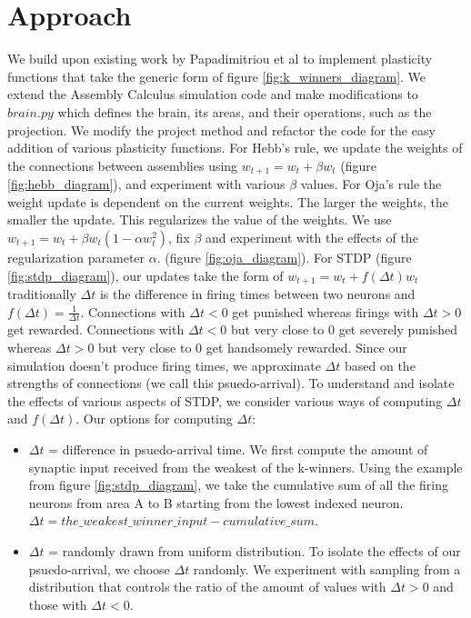 \documentclass{article}
\begin{document}
\section{Approach}
We build upon existing work by Papadimitriou et al \cite{Papadimitriou14464} to implement plasticity functions that take the generic form of figure \ref{fig:k_winners_diagram}.
We extend the Assembly Calculus simulation code \cite{assembly_calculus} and make modifications to $brain.py$ which defines the brain, its areas, and their operations, such as the projection.
We modify the project method and refactor the code for the easy addition of various plasticity functions.
For Hebb's rule, we update the weights of the connections between assemblies using $w_{t+1} = w_t + \beta w_t$ (figure \ref{fig:hebb_diagram}), and experiment with various $\beta$ values.
For Oja's rule the weight update is dependent on the current weights. The larger the weights, the smaller the update. This regularizes the value of the weights. We use $ w_{t+1} = w_t + \beta w_t (1 - \alpha w_t^2)$, fix $\beta$ and experiment with the effects of the regularization parameter $\alpha$.
(figure \ref{fig:oja_diagram}).
For STDP (figure \ref{fig:stdp_diagram}), our updates take the form of $w_{t+1} = w_t + f(\Delta t) w_t$ traditionally $\Delta t$ is the difference in firing times between two neurons and $f(\Delta t) = \frac{1}{\Delta t}$. Connections with $\Delta t < 0$ get punished whereas firings with $\Delta t > 0$ get rewarded. Connections with $\Delta t < 0$ but very close to 0 get severely punished whereas $\Delta t > 0$ but very close to 0 get handsomely rewarded. Since our simulation doesn't produce firing times, we approximate $\Delta t$ based on the strengths of connections (we call this psuedo-arrival). 
To understand and isolate the effects of various aspects of STDP, we consider various ways of computing $\Delta t$ and $f(\Delta t)$. Our options for computing  $\Delta t$:\\
\begin{itemize}
    \item $\Delta t$ = difference in psuedo-arrival time. We first compute the amount of synaptic input received from the weakest of the k-winners. Using the example from figure \ref{fig:stdp_diagram}, we take the cumulative sum of all the firing neurons from area A to B starting from the lowest indexed neuron. $\Delta t = the\_weakest\_winner\_input - cumulative\_sum$.
    \item $\Delta t$ = randomly drawn from uniform distribution. To isolate the effects of our psuedo-arrival, we choose $\Delta t$ randomly. We experiment with sampling from a distribution that controls the ratio of the amount of values with $\Delta t > 0$ and those with $\Delta t < 0$.
\end{itemize}
\end{document}
